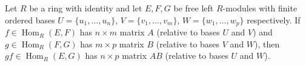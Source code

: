 Let $R$ be a ring with identity and let $E,F,G$ be free left $R$-modules with finite ordered bases $U = \{u_1, \ldots, u_n\}$, $V = \{v_1, \ldots, v_m\}$, $W = \{w_1, \ldots, w_p\}$ respectively. If $f \in \operatorname{Hom}_R(E,F)$ has $n \times m$ matrix $A$ (relative to bases $U$ and $V$) and $g \in \operatorname{Hom}_R(F,G)$ has $m \times p$ matrix $B$ (relative to bases $V$ and $W$), then $gf \in \operatorname{Hom}_R(E,G)$ has $n \times p$ matrix $AB$ (relative to bases $U$ and $W$).
